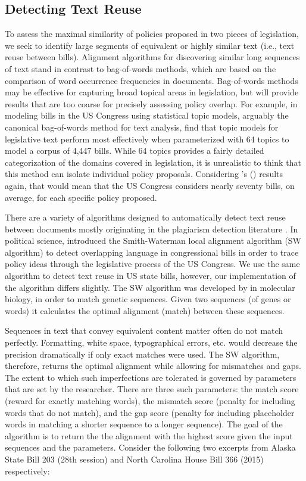 \documentclass[12pt]{article} %
\def\citeapos#1{\citeauthor{#1}'s (\citeyear{#1})}
\begin{document}
\subsection{Detecting Text Reuse}
To assess the maximal similarity of policies proposed in two pieces of legislation, we seek to identify large segments of equivalent or highly similar text (i.e., text reuse between bills). Alignment algorithms for discovering similar long sequences of text stand in contrast to bag-of-words methods, which are based on the comparison of word occurrence frequencies in documents. Bag-of-words methods may be effective for capturing broad topical areas in legislation, but will provide results that are too coarse for precisely assessing policy overlap. For example, in modeling bills in the US Congress using statistical topic models, arguably the canonical bag-of-words method for text analysis, \citet{gerrish2011predicting} find that topic models for legislative text perform most effectively when parameterized with 64 topics to model a corpus of 4,447 bills. While 64 topics provides a fairly detailed categorization of the domains covered in legislation, it is unrealistic to think that this method can isolate individual policy proposals.  Considering \citeapos{gerrish2011predicting} results again, that would mean that the US Congress considers nearly seventy bills, on average, for each specific policy proposed. 

There are a variety of algorithms designed to automatically detect text reuse between documents mostly originating in the plagiarism detection literature \citep[see e.g.][for an overview]{potthast2013overview}. In political science, \citet{wilkerson2015tracing} introduced the Smith-Waterman local alignment algorithm (SW algorithm) to detect overlapping language in congressional bills in order to trace policy ideas through the legislative process of the US Congress. We use the same algorithm to detect text reuse in US state bills, however, our implementation of the algorithm differs slightly. The SW algorithm was developed by \citet{smith1981identification} in molecular biology, in order to match genetic sequences. Given two sequences (of genes or words) it calculates the optimal alignment (match) between these sequences. 

Sequences in text that convey equivalent content matter often do not match perfectly. Formatting, white space, typographical errors, etc. would decrease the precision dramatically if only exact matches were used. The SW algorithm, therefore, returns the optimal alignment while allowing for mismatches and gaps. The extent to which such imperfections are tolerated is governed by parameters that are set by the researcher. There are three such parameters: the match score (reward for exactly matching words), the mismatch score (penalty for including words that do not match), and the gap score (penalty for including placeholder words in matching a shorter sequence to a longer sequence). The goal of the algorithm is to return the the alignment with the highest score given the input sequences and the parameters. Consider the following two excerpts from Alaska State Bill 203 (28th session) and North Carolina House Bill 366 (2015) respectively:
\end{document}
